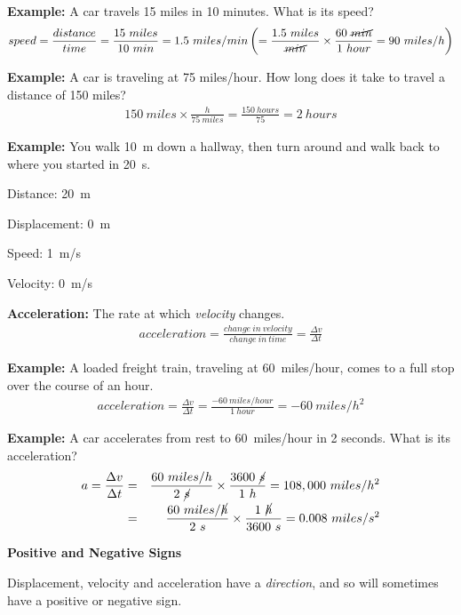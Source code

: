 \documentclass[12pt]{article}
\begin{document}
\noindent \textbf{Example:} A car travels 15 miles in 10 minutes. What is its speed?
\begin{eqnarray}
speed = \frac{distance}{time} = \frac{15~miles}{10~min} = 1.5~miles/min\left(=\frac{1.5~miles}{\cancel{min}}\times\frac{60~\cancel{min}}{1~hour}=90~miles/h\right)
\end{eqnarray}

\noindent \textbf{Example:} A car is traveling at 75 miles/hour. How long does it take to travel a distance of 150 miles?
\begin{eqnarray}
150~miles \times \frac{h}{75~miles} = \frac{150~hours}{75} = 2~hours
\end{eqnarray}

\noindent \textbf{Example:} You walk 10~m down a hallway, then turn around and walk back to where you started in 20~s.

Distance: 20~m

Displacement: 0~m

Speed: 1~m/s

Velocity: 0~m/s
	
\clearpage

\noindent \textbf{Acceleration:} The rate at which \textit{velocity} changes.
\begin{eqnarray}
acceleration = \frac{change~in~velocity}{change~in~time} = \frac{\Delta v}{\Delta t}
\end{eqnarray}

\noindent\textbf{Example:} A loaded freight train, traveling at 60~miles/hour, comes to a full stop over the course of an hour. 
\begin{eqnarray}
acceleration = \frac{\Delta v}{\Delta t} = \frac{-60~miles/hour}{1~hour} = -60~miles/h^2
\end{eqnarray}

\noindent \textbf{Example:} A car accelerates from rest to 60~miles/hour in 2 seconds. What is its acceleration?
\begin{eqnarray}
a = \frac{\Delta v}{\Delta t} &=& \frac{60~miles/h}{2~\cancel{s}}\times\frac{3600~\cancel{s}}{1~h} = 108,000~miles/h^2 \\
&=& \frac{60~miles/\cancel{h}}{2~s} \times \frac{1~\cancel{h}}{3600~s} = 0.008 ~miles/s^2
\end{eqnarray}

\noindent \textbf{\large Positive and Negative Signs}

Displacement, velocity and acceleration have a \textit{direction}, and so will sometimes have a positive or negative sign.
\end{document}
